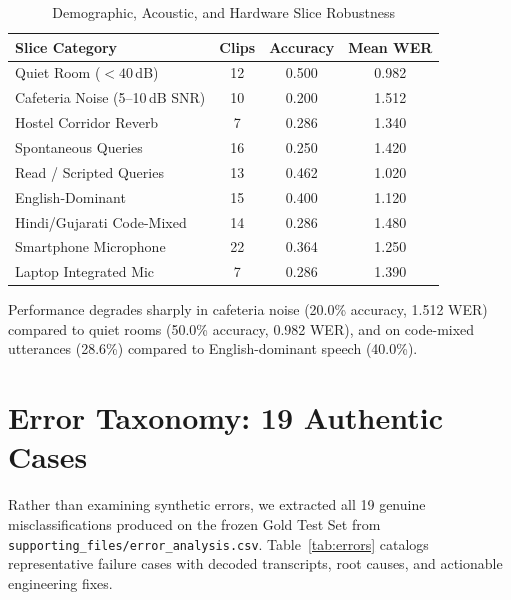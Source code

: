 \documentclass[sigconf,authordraft]{acmart}
\begin{document}
\begin{table}[h]
  \caption{Demographic, Acoustic, and Hardware Slice Robustness}
  \label{tab:slices}
  \centering
  \small
  \begin{tabular}{lccc}
    \toprule
    \textbf{Slice Category} & \textbf{Clips} & \textbf{Accuracy} & \textbf{Mean WER} \\
    \midrule
    Quiet Room ($< 40$\,dB) & 12 & 0.500 & 0.982 \\
    Cafeteria Noise (5--10\,dB SNR) & 10 & 0.200 & 1.512 \\
    Hostel Corridor Reverb & 7 & 0.286 & 1.340 \\
    Spontaneous Queries & 16 & 0.250 & 1.420 \\
    Read / Scripted Queries & 13 & 0.462 & 1.020 \\
    English-Dominant & 15 & 0.400 & 1.120 \\
    Hindi/Gujarati Code-Mixed & 14 & 0.286 & 1.480 \\
    Smartphone Microphone & 22 & 0.364 & 1.250 \\
    Laptop Integrated Mic & 7 & 0.286 & 1.390 \\
    \bottomrule
  \end{tabular}
\end{table}

Performance degrades sharply in cafeteria noise (20.0\% accuracy, 1.512 WER) compared to quiet rooms
(50.0\% accuracy, 0.982 WER), and on code-mixed utterances (28.6\%) compared to English-dominant speech (40.0\%).

\section{Error Taxonomy: 19 Authentic Cases}
\label{sec:errors}

Rather than examining synthetic errors, we extracted all 19 genuine misclassifications produced on
the frozen Gold Test Set from \texttt{supporting\_files/error\_analysis.csv}. Table~\ref{tab:errors}
catalogs representative failure cases with decoded transcripts, root causes, and actionable engineering fixes.
\end{document}
